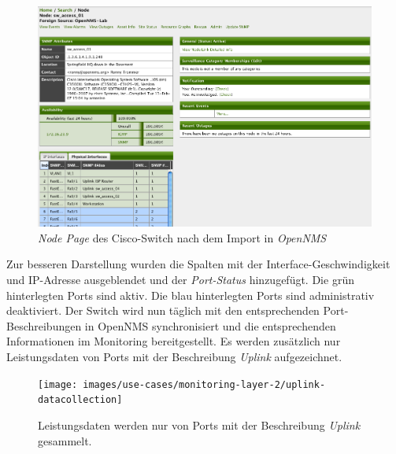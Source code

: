 \begin{figure}[H]
	\centering
	\includegraphics[width=1.0\textwidth]{images/use-cases/monitoring-layer-2/node-page}
	\caption{\textit{Node Page} des Cisco-Switch nach dem Import in \textit{OpenNMS}}
	\label{pic:node-page}
\end{figure}
Zur besseren Darstellung wurden die Spalten mit der Interface-Geschwindigkeit und IP-Adresse ausgeblendet und der \textit{Port-Status} hinzugefügt. Die grün hinterlegten Ports sind aktiv. Die blau hinterlegten Ports sind administrativ deaktiviert. Der Switch wird nun täglich  mit den entsprechenden Port-Beschreibungen in OpenNMS synchronisiert und die entsprechenden Informationen im Monitoring bereitgestellt. Es werden zusätzlich nur Leistungsdaten von Ports mit der Beschreibung \textit{Uplink} aufgezeichnet.
\begin{figure}[H]
	\centering
	\texttt{[image: images/use-cases/monitoring-layer-2/uplink-datacollection]}
	\caption{Leistungsdaten werden nur von Ports mit der Beschreibung \textit{Uplink} gesammelt.}
	\label{pic:uplink-datacollection}
\end{figure}

